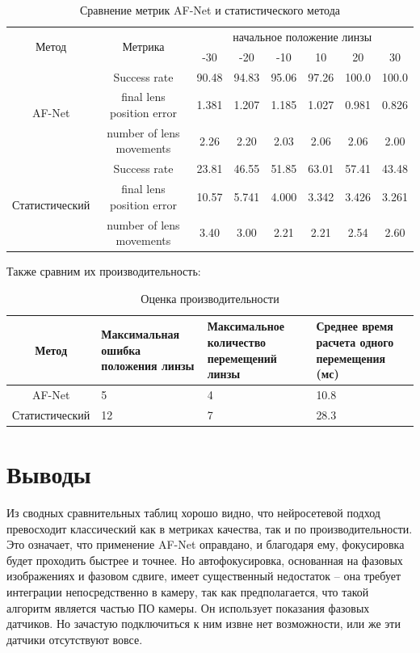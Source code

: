 \begin{table}[!htbp]
	\centering
	\small
	\begin{tabular}{|c|c|c|c|c|c|c|c|}
		\hline
		\multirow{2}{*}{Метод}& \multirow{2}{*}{Метрика} & \multicolumn{6}{c|}{начальное положение линзы} \\
		\cline{3-8} & & -30 & -20 & -10 & 10 & 20 & 30\\ \hline
		\multirow{3}{*}{AF-Net} & Success rate & 90.48 & 94.83 & 95.06 & 97.26 & 100.0 & 100.0\\ 
		\cline{2-8} & final lens position error & 1.381 & 1.207 & 1.185 & 1.027 & 0.981 & 0.826 \\
		\cline{2-8} & number of lens movements & 2.26 & 2.20 & 2.03 & 2.06 & 2.06 & 2.00\\ \hline
		\multirow{3}{*}{Статистический} & Success rate & 23.81 & 46.55 & 51.85 & 63.01 & 57.41 & 43.48\\ 
		\cline{2-8} & final lens position error & 10.57 & 5.741 & 4.000 & 3.342 & 3.426 & 3.261 \\
		\cline{2-8} & number of lens movements & 3.40 & 3.00 & 2.21 & 2.21 & 2.54 & 2.60\\ \hline
	\end{tabular}
	\caption{Сравнение метрик AF-Net и статистического метода}
	\label{tab:Comparison}
\end{table}

Также сравним их производительность:

\begin{table}[!htbp]
	\centering
	\small
	\begin{tabular}{|c|p{4cm}<{\centering}|p{4cm}<{\centering}|p{4cm}<{\centering}|}
		\hline
		Метод & Максимальная ошибка положения линзы & Максимальное количество перемещений линзы & Среднее время расчета одного перемещения (мс)\\ \hline
		AF-Net & 5 & 4 & 10.8\\ \hline
		Статистический & 12 & 7 & 28.3 \\ \hline
	\end{tabular}
	\caption{Оценка производительности}
	\label{tab:performance}
\end{table}


\section{Выводы} \label{ch1:conclusion}

Из сводных сравнительных таблиц хорошо видно, что нейросетевой подход превосходит классический как в метриках качества, так и по производительности. Это означает, что применение AF-Net оправдано, и благодаря ему, фокусировка будет проходить быстрее и точнее. Но автофокусировка, основанная на фазовых изображениях и фазовом сдвиге, имеет существенный недостаток -- она требует интеграции непосредственно в камеру, так как предполагается, что такой алгоритм является частью ПО камеры. Он использует показания фазовых датчиков. Но зачастую подключиться к ним извне нет возможности, или же эти датчики отсутствуют вовсе.